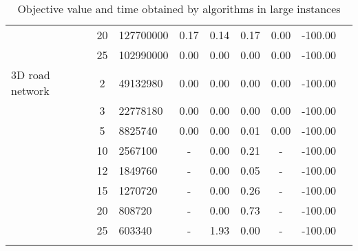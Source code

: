 {\begin{longtable}{@{}lclcccccc@{}}
                  & 20 & 127700000        & 0.17    & 0.14    & 0.17   & 0.00 & -100.00 &           \\
                  & 25 & 102990000        & 0.00    & 0.00    & 0.00   & 0.00 & -100.00 &           \\ \hline
3D road network   & 2  & 49132980         & 0.00    & 0.00    & 0.00   & 0.00 & -100.00 &           \\
                  & 3  & 22778180         & 0.00    & 0.00    & 0.00   & 0.00 & -100.00 &           \\
                  & 5  & 8825740          & 0.00    & 0.00    & 0.01   & 0.00 & -100.00 &           \\
                  & 10 & 2567100          & -       & 0.00    & 0.21   & -    & -100.00 &           \\
                  & 12 & 1849760          & -       & 0.00    & 0.05   & -    & -100.00 &           \\
                  & 15 & 1270720          & -       & 0.00    & 0.26   & -    & -100.00 &           \\
                  & 20 & 808720           & -       & 0.00    & 0.73   & -    & -100.00 &           \\
                  & 25 & 603340           & -       & 1.93    & 0.00   & -    & -100.00 &         
\\ \bottomrule
\caption{Objective value and time obtained by algorithms in large instances}
\end{longtable}}
\label{results-all-C}